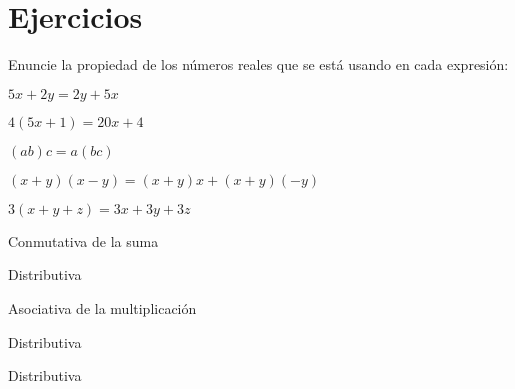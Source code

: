 
\section{Ejercicios}

\begin{exercise}
\problem Enuncie la propiedad de los números reales que se está usando en cada expresión:

\begin{exerciselist}
    \item $5x + 2y = 2y + 5x$
    \item $4(5x + 1) = 20x + 4$
    \item $(ab)c = a(bc)$
    \item $(x + y)(x-y) = (x+y)x + (x+y)(-y)$
    \item $3(x + y + z) = 3x + 3y + 3z$
\end{exerciselist}

\begin{solucion}
\begin{exerciselist}
    \item Conmutativa de la suma
    \item Distributiva
    \item Asociativa de la multiplicación
    \item Distributiva
    \item Distributiva
\end{exerciselist}
\end{solucion}
\end{exercise}


